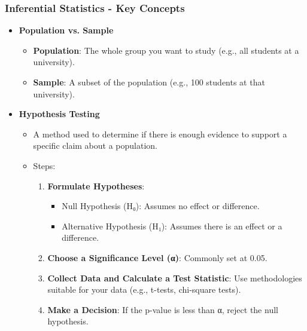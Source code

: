 \documentclass[aspectratio=169]{beamer}
\begin{document}
\begin{frame}[fragile]
    \frametitle{Inferential Statistics - Key Concepts}
    \begin{itemize}
        \item \textbf{Population vs. Sample}
            \begin{itemize}
                \item \textbf{Population}: The whole group you want to study (e.g., all students at a university).
                \item \textbf{Sample}: A subset of the population (e.g., 100 students at that university).
            \end{itemize}
        
        \item \textbf{Hypothesis Testing}
            \begin{itemize}
                \item A method used to determine if there is enough evidence to support a specific claim about a population.
                \item Steps:
                    \begin{enumerate}
                        \item \textbf{Formulate Hypotheses}:
                            \begin{itemize}
                                \item Null Hypothesis (H₀): Assumes no effect or difference.
                                \item Alternative Hypothesis (H₁): Assumes there is an effect or a difference.
                            \end{itemize}
                        \item \textbf{Choose a Significance Level (α)}: Commonly set at 0.05.
                        \item \textbf{Collect Data and Calculate a Test Statistic}: Use methodologies suitable for your data (e.g., t-tests, chi-square tests).
                        \item \textbf{Make a Decision}: If the p-value is less than α, reject the null hypothesis.
                    \end{enumerate}
            \end{itemize}
    \end{itemize}
\end{frame}
\end{document}
